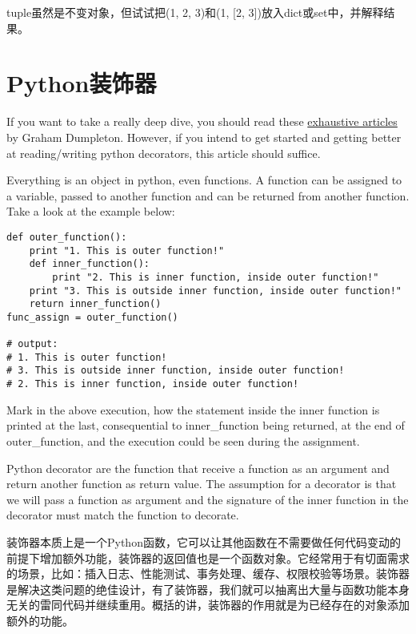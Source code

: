 \documentclass[10pt,a4paper]{ctexbook}
\begin{document}
tuple虽然是不变对象，但试试把(1, 2, 3)和(1, [2, 3])放入dict或set中，并解释结果。


\section{Python装饰器}
If you want to take a really deep dive, you should read these \href{https://github.com/GrahamDumpleton/wrapt/tree/develop/blog}{exhaustive articles} by Graham Dumpleton. However, if you intend to get started and getting better at reading/writing python decorators, this article should suffice.

Everything is an object in python, even functions. A function can be assigned to a variable, passed to another function and can be returned from another function. Take a look at the example below:

\begin{verbatim}
def outer_function():
    print "1. This is outer function!"
    def inner_function():
        print "2. This is inner function, inside outer function!"
    print "3. This is outside inner function, inside outer function!"
    return inner_function()
func_assign = outer_function()

# output:
# 1. This is outer function!
# 3. This is outside inner function, inside outer function!
# 2. This is inner function, inside outer function!
\end{verbatim}

Mark in the above execution, how the statement inside the inner function is printed at the last, consequential to inner\_function being returned, at the end of outer\_function, and the execution could be seen during the assignment.

Python decorator are the function that receive a function as an argument and return another function as return value. The assumption for a decorator is that we will pass a function as argument and the signature of the inner function in the decorator must match the function to decorate.

装饰器本质上是一个Python函数，它可以让其他函数在不需要做任何代码变动的前提下增加额外功能，装饰器的返回值也是一个函数对象。它经常用于有切面需求的场景，比如：插入日志、性能测试、事务处理、缓存、权限校验等场景。装饰器是解决这类问题的绝佳设计，有了装饰器，我们就可以抽离出大量与函数功能本身无关的雷同代码并继续重用。概括的讲，装饰器的作用就是为已经存在的对象添加额外的功能。
\end{document}
